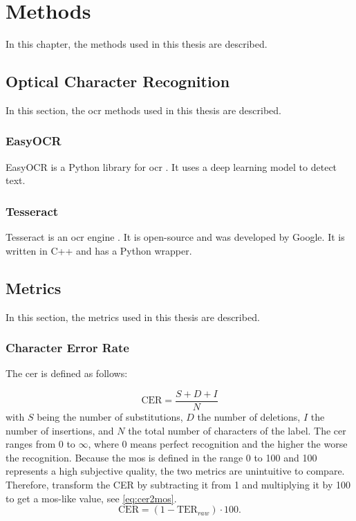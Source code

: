 \chapter{Methods}
\label{chap:methods}

In this chapter, the methods used in this thesis are described.

\section{Optical Character Recognition}
\label{sec:ocr}

In this section, the \gls{ocr} methods used in this thesis are described.

\subsection{EasyOCR}
\label{subsec:easyocr}

EasyOCR is a Python library for \gls{ocr} \cite{easyocr}. It uses a deep learning model to detect text.

\subsection{Tesseract}
\label{subsec:tesseract}

Tesseract is an \gls{ocr} engine \cite{tesseract}. It is open-source and was developed by Google. It is written in C++ and has a Python wrapper.

\section{Metrics}
\label{sec:metrics}

In this section, the metrics used in this thesis are described.

\subsection{Character Error Rate}
\label{subsec:cer}

The \gls{cer} is defined as follows:

\begin{equation}
    \text{CER} = \frac{S + D + I}{N}
    \label{eq:cer}
\end{equation}
with \(S\) being the number of substitutions, \(D\) the number of deletions, \(I\) the number of insertions, and \(N\) the total number of characters of the label.
The \gls{cer} ranges from 0 to $\infty$, where 0 means perfect recognition and the higher the worse the recognition.
Because the \gls{mos} is defined in the range 0 to 100 and 100 represents a high subjective quality, the two metrics are unintuitive to compare.
Therefore, transform the CER by subtracting it from 1 and multiplying it by 100 to get a \gls{mos}-like value, see \autoref{eq:cer2mos}.
\begin{equation}
    \text{CER} = (1 - \text{TER}_{raw}) \cdot 100.
    \label{eq:cer2mos}
\end{equation}

